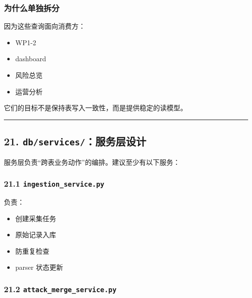 \documentclass[UTF8]{ctexart}
\providecommand{\tightlist}{%
  \setlength{\itemsep}{0pt}\setlength{\parskip}{0pt}}
\begin{document}
\hypertarget{ux4e3aux4ec0ux4e48ux5355ux72ecux62c6ux5206}{%
\subsubsection{为什么单独拆分}\label{ux4e3aux4ec0ux4e48ux5355ux72ecux62c6ux5206}}

因为这些查询面向消费方：

\begin{itemize}
\tightlist
\item
  WP1-2
\item
  dashboard
\item
  风险总览
\item
  运营分析
\end{itemize}

它们的目标不是保持表写入一致性，而是提供稳定的读模型。

\begin{center}\rule{0.5\linewidth}{0.5pt}\end{center}

\hypertarget{dbservicesux670dux52a1ux5c42ux8bbeux8ba1}{%
\subsection{\texorpdfstring{21.
\texttt{db/services/}：服务层设计}{21. db/services/：服务层设计}}\label{dbservicesux670dux52a1ux5c42ux8bbeux8ba1}}

服务层负责``跨表业务动作''的编排。建议至少有以下服务：

\hypertarget{ingestion_service.py}{%
\subsubsection{\texorpdfstring{21.1
\texttt{ingestion\_service.py}}{21.1 ingestion\_service.py}}\label{ingestion_service.py}}

负责：

\begin{itemize}
\tightlist
\item
  创建采集任务
\item
  原始记录入库
\item
  防重复检查
\item
  parser 状态更新
\end{itemize}

\hypertarget{attack_merge_service.py}{%
\subsubsection{\texorpdfstring{21.2
\texttt{attack\_merge\_service.py}}{21.2 attack\_merge\_service.py}}\label{attack_merge_service.py}}
\end{document}
